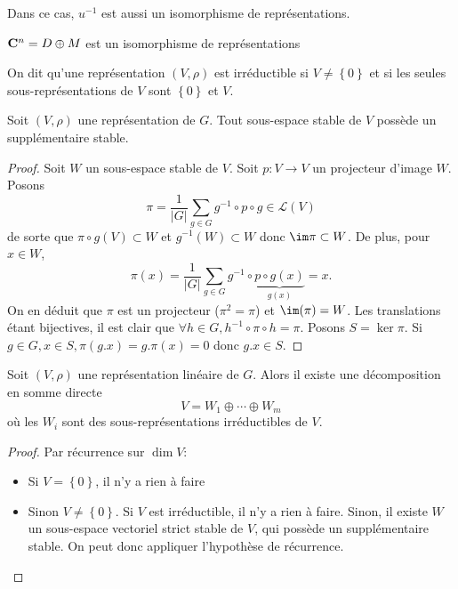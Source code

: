 \begin{rem}
Dans ce cas, $u^{-1}$ est aussi un isomorphisme de représentations.
\end{rem}

\begin{ex}
$ \mathbf C^n=D\oplus M$ est un isomorphisme de représentations
\end{ex}

\begin{dfn}
    On dit qu'une représentation $(V, \rho)$ est irréductible si $V\neq \left\{ 0 \right\} $ et si les seules sous-représentations de $V$ sont  $\left\{ 0 \right\} $ et $V$.
\end{dfn}

\begin{thm}
    Soit $(V, \rho)$ une représentation de  $G$. Tout sous-espace stable de  $V$ possède un supplémentaire stable.
\end{thm}

\begin{proof}
Soit $W$ un sous-espace stable de $V$. Soit $p : V \longrightarrow  V$ un projecteur d'image $W$. Posons \[
    \pi=\frac1{|G|}\sum_{g \in  G}g^{-1}\circ p \circ g \in  \mathcal  L(V)
\] 
de sorte que $\pi\circ g(V)\subset W$ et  $g^{-1}(W)\subset W$ donc $\im \pi\subset W$. De plus, pour  $x \in  W$, \[
    \pi(x)=\frac1{|G|}\sum_{g \in  G}g^{-1} \circ \underbrace{p\circ g(x)}_{g(x)}=x.
\]
On en déduit que $\pi$ est un projecteur ($\pi^2=\pi$) et $\im(\pi)=W$.
Les translations étant bijectives, il est clair que  $\forall  h \in  G, h^{-1}\circ \pi\circ h=\pi$. Posons $S=\ker \pi $. Si  $g \in  G, x \in  S, \pi(g.x)=g.\pi(x)=0$ donc $g.x \in  S$.
\end{proof}

\begin{thm}
    Soit $(V, \rho)$ une représentation linéaire de  $G$. Alors il existe une décomposition en somme directe  \[
    V = W_1\oplus \cdots \oplus W_m
    \] 
    où les $W_i$ sont des sous-représentations irréductibles de  $V$.
\end{thm}

\begin{proof}
Par récurrence sur $\dim V$:  \begin{itemize}
    \item Si $V = \left\{ 0 \right\} $, il n'y a rien à faire
    \item Sinon $V\neq \left\{ 0 \right\} $. Si $V$ est irréductible, il n'y a rien à faire. Sinon, il existe  $W$ un sous-espace vectoriel strict stable de  $V$, qui possède un supplémentaire stable. On peut donc appliquer l'hypothèse de récurrence.
\end{itemize}
\end{proof}

